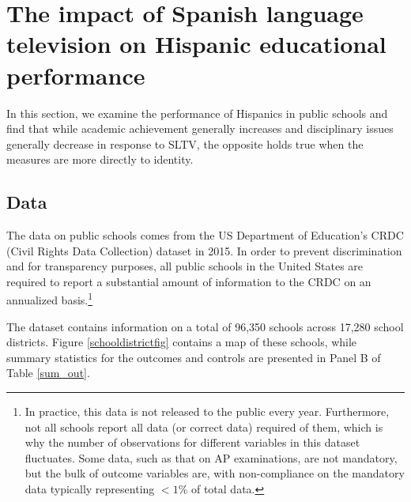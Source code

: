 \documentclass[11pt]{article}
\begin{document}


\section{The impact of Spanish language television on Hispanic educational performance}\label{s:school}

In this section, we examine the performance of Hispanics in public schools and find that while academic achievement generally increases and disciplinary issues generally decrease in response to SLTV, the opposite holds true when the measures are more directly to identity. 

\subsection{Data}

The data on public schools comes from the US Department of Education's CRDC (Civil Rights Data Collection) dataset in 2015. In order to prevent discrimination and for transparency purposes, all public schools in the United States are required to report a substantial amount of information to the CRDC on an annualized basis.\footnote{ In practice, this data is not released to the public every year. Furthermore, not all schools report all data (or correct data) required of them, which is why the number of observations for different variables in this dataset fluctuates. Some data, such as that on AP examinations, are not mandatory, but the bulk of outcome variables are, with non-compliance on the mandatory data typically representing $<1\%$ of total data.} 

The dataset contains information on a total of 96,350 schools across 17,280 school districts. Figure \ref{schooldistrictfig} contains a map of these schools, while summary statistics for the outcomes and controls are presented in Panel B of Table \ref{sum_out}.
\end{document}
